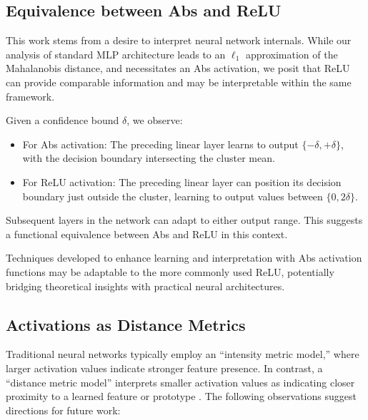 \subsection{Equivalence between Abs and ReLU}

This work stems from a desire to interpret neural network internals. While our analysis of standard MLP architecture leads to an $\ell_1$ approximation of the Mahalanobis distance, and necessitates an Abs activation, we posit that ReLU can provide comparable information and may be interpretable within the same framework.

Given a confidence bound $\delta$, we observe:

\begin{itemize}
    \item For Abs activation: The preceding linear layer learns to output $\{-\delta, +\delta\}$, with the decision boundary intersecting the cluster mean.
    \item For ReLU activation: The preceding linear layer can position its decision boundary just outside the cluster, learning to output values between $\{0, 2\delta\}$.
\end{itemize}

Subsequent layers in the network can adapt to either output range. This suggests a functional equivalence between Abs and ReLU in this context.

Techniques developed to enhance learning and interpretation with Abs activation functions may be adaptable to the more commonly used ReLU, potentially bridging theoretical insights with practical neural architectures.

\subsection{Activations as Distance Metrics}

Traditional neural networks typically employ an ``intensity metric model,'' where larger activation values indicate stronger feature presence. In contrast, a ``distance metric model'' interprets smaller activation values as indicating closer proximity to a learned feature or prototype \citep{broomhead1988radial}. The following observations suggest directions for future work:

